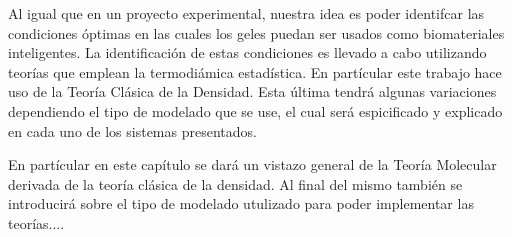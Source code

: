 Al igual que en un proyecto experimental, nuestra idea es poder identifcar las condiciones \'optimas en las cuales los geles puedan ser usados como biomateriales inteligentes. 
La identificaci\'on de estas condiciones es llevado a cabo utilizando teor\'ias que emplean la termodi\'amica estad\'istica. En part\'icular este trabajo hace uso de la Teor\'ia Cl\'asica de la Densidad. Esta \'ultima tendr\'a algunas variaciones dependiendo el tipo de modelado que se use, el cual ser\'a espicificado y explicado en cada uno de los sistemas presentados.

En part\'icular en este cap\'itulo se dar\'a un vistazo general de la Teor\'ia Molecular derivada de la teor\'ia cl\'asica de la densidad. 
Al final del mismo tambi\'en se introducir\'a sobre el tipo de modelado utulizado para poder implementar las teor\'ias....
 

